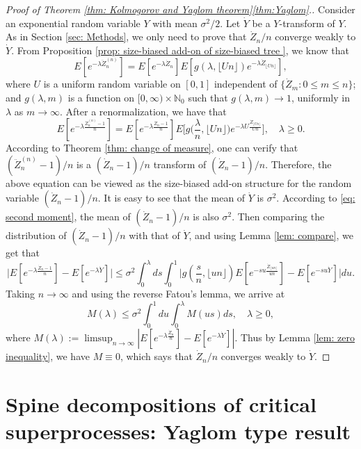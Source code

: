 \documentclass[UTF8]{pkuthss}
\theoremstyle{plain}
\theoremstyle{definition}
\numberwithin{equation}{section}
\begin{document}
\begin{proof}[Proof of Theorem \ref{thm: Kolmogorov and Yaglom theorem}\eqref{thm:Yaglom}.]
	Consider an exponential random variable $Y$ with mean $\sigma^2/2$.
	Let $\dot Y$ be a $Y$-transform of $Y$.
	As in Section \ref{sec: Methods},
	we only need to prove that
	$\dot Z_n/n$ converge weakly to $\dot Y$.
	From Proposition \ref{prop: size-biased add-on of size-biased tree }, we know that
	\[
	E [ e^{- \lambda \ddot Z_n^{(n)}} ]
	= E [e^{-\lambda \dot Z_n}] E[g(\lambda, \lfloor Un \rfloor )e^{-\lambda \dot Z_{ \lfloor Un \rfloor}}],
	\]
	where $U$ is a uniform  random variable on $[0,1]$ independent of $\{\dot Z_m: 0\le m\le n\}$;
	and $g(\lambda, m)$ is a function on $[0,\infty) \times \mathbb N_0$ such that
	$g(\lambda, m) \to 1$, uniformly in $\lambda$ as $m\to \infty$.
	After a renormalization, we have that
\[
	E [ e^{- \lambda \frac{\ddot Z_n^{(n)}-1}{n}} ]
	= E [e^{-\lambda \frac{\dot Z_n - 1}{n}}] E\big[g\big(\frac{\lambda}{n}, \lfloor Un \rfloor \big)e^{-\lambda U \frac{\dot Z_{\lfloor Un \rfloor}}{Un} }\big],
	\quad \lambda \geq 0.
\]
	According to Theorem \ref{thm: change of measure}, one can verify that
	$(\ddot Z_n^{(n)} - 1)/n$ is a $(\dot Z_n - 1)/n$ transform of $(\dot Z_n - 1)/n$.
	Therefore, the above equation can be viewed as the size-biased add-on structure for the random variable $(\dot Z_n - 1)/n$.
	It is easy to see that the mean of $\dot Y$ is $\sigma^2$.
	According to \eqref{eq: second moment}, the mean of $(\dot Z_n - 1)/n$ is also $\sigma^2$.
	Then comparing the distribution of $(\dot Z_n - 1)/n$ with that of $\dot Y$, and  using Lemma \ref{lem: compare}, we get that
	\[
	\big| E[e^{-\lambda \frac{\dot Z_n - 1}{n}}] - E[e^{-\lambda \dot Y}]\big|
	\leq \sigma^2 \int_0^\lambda ds \int_0^1 \big| g(\frac{s}{n}, \lfloor un \rfloor ) E[e^{-su \frac { \dot Z_{ \lfloor un \rfloor } } {un} }] - E[e^{- su \dot Y}]\big| du.
	\]
	Taking $n\to \infty$ and using the reverse Fatou's lemma, we arrive at
	\[
	M(\lambda)
	\leq \sigma^2 \int_0^1du \int_0^\lambda M(us)ds,
	\quad \lambda\geq 0,
	\]
	where
	$M(\lambda) := \limsup_{n\to \infty} | E[ e^{- \lambda \frac{\dot Z_n }{n}}] - E[e^{-\lambda \dot Y}]|$.
	Thus by Lemma \ref{lem: zero inequality}, we have $M \equiv 0$, which says that $\dot Z_n/n$ converges weakly to $\dot Y$.
\end{proof}



\chapter{Spine decompositions of critical superprocesses: Yaglom type result}
\end{document}
